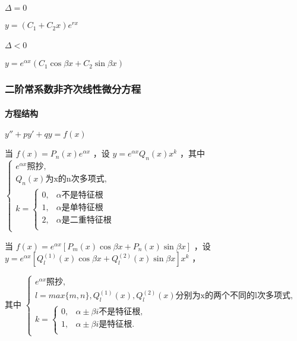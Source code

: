 ﻿\documentclass[a4paper,12pt,UTF8]{ctexart}
\begin{document}
    \paragraph{\(\Delta=0\)} \(y=(C_1+C_2x)e^{rx}\)
    \paragraph{\(\Delta<0\)} \(y=e^{\alpha x}(C_1\cos\beta x+C_2\sin\beta x)\)
    
    \subsubsection{二阶常系数非齐次线性微分方程}
    \paragraph{方程结构} \(y''+py'+qy=f(x)\)

    当 \(f(x)=P_n(x)e^{\alpha x}\) ，设 \(y=e^{\alpha x}Q_n(x)x^k\) ，其中
    \(\begin{cases}
        e^{\alpha x}\text{照抄},\\
        Q_n(x)\text{为x的n次多项式},\\
        k=
        \begin{cases}
            0, &\alpha\text{不是特征根}\\
            1, &\alpha\text{是单特征根}\\
            2, &\alpha\text{是二重特征根}\\
        \end{cases} 
    \end{cases}\)
    
    当 \(f(x)=e^{\alpha x}\left[P_m(x)\cos \beta x + P_n(x)\sin \beta x\right]\) ，设 \(y=e^{\alpha x} \left[Q_l^{(1)}(x)\cos \beta x + Q_l^{(2)}(x)\sin \beta x\right]x^k\) ，
    
    其中
    \(\begin{cases}
        e^{\alpha x}\text{照抄},\\
        l=max\{m,n\},Q_l^{(1)}(x),Q_l^{(2)}(x)\text{分别为x的两个不同的l次多项式},\\
        k=
        \begin{cases}
            0, &\alpha\pm\beta i \text{不是特征根},\\
            1, &\alpha\pm\beta i \text{是特征根}.\\
        \end{cases} 
    \end{cases}\)
\end{document}
